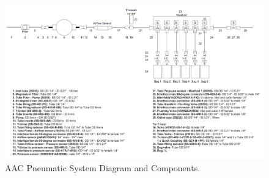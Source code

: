 \begin{landscape}
\begin{figure}
    \centering
    \includegraphics[width=1.45\textwidth,height=\textheight]{4-experiment-design/img/Mechanical/AAC_System.png}
    \caption{AAC Pneumatic System Diagram and Components.}
    \label{pneumatic_system}
\end{figure}
\end{landscape}

